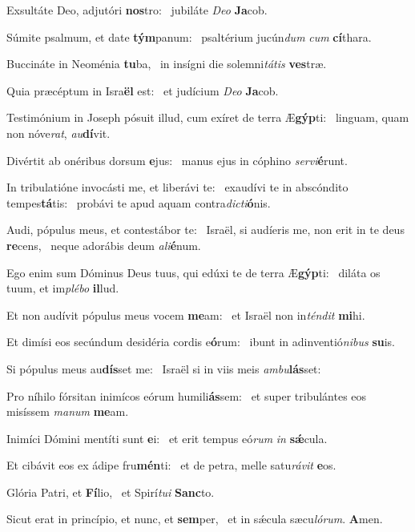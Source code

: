 \item Exsultáte Deo, adjutóri \textbf{nos}tro:~\psstar{} jubiláte \textit{Deo} \textbf{Ja}cob.
\item Súmite psalmum, et date \textbf{tým}panum:~\psstar{} psaltérium jucún\textit{dum} \textit{cum} \textbf{cí}thara.
\item Buccináte in Neoménia \textbf{tu}ba,~\psstar{} in insígni die solemni\textit{tátis} \textbf{ves}træ.
\item Quia præcéptum in Isra\textbf{ël} est:~\psstar{} et judícium \textit{Deo} \textbf{Ja}cob.
\item Testimónium in Joseph pósuit illud, cum exíret de terra Æ\textbf{gýp}ti:~\psstar{} linguam, quam non nóve\textit{rat}, \textit{au}\textbf{dí}vit.
\item Divértit ab onéribus dorsum \textbf{e}jus:~\psstar{} manus ejus in cóphino \textit{servi}\textbf{é}runt.
\item In tribulatióne invocásti me, et liberávi te:~\pscross{} exaudívi te in abscóndito tempes\textbf{tá}tis:~\psstar{} probávi te apud aquam contra\textit{dicti}\textbf{ó}nis.
\item Audi, pópulus meus, et contestábor te:~\pscross{} Israël, si audíeris me, non erit in te deus \textbf{re}cens,~\psstar{} neque adorábis deum \textit{ali}\textbf{é}num.
\item Ego enim sum Dóminus Deus tuus, qui edúxi te de terra Æ\textbf{gýp}ti:~\psstar{} diláta os tuum, et im\textit{plébo} \textbf{il}lud.
\item Et non audívit pópulus meus vocem \textbf{me}am:~\psstar{} et Israël non in\textit{téndit} \textbf{mi}hi.
\item Et dimísi eos secúndum desidéria cordis e\textbf{ó}rum:~\psstar{} ibunt in adinventió\textit{nibus} \textbf{su}is.
\item Si pópulus meus au\textbf{dís}set me:~\psstar{} Israël si in viis meis \textit{ambu}\textbf{lás}set:
\item Pro níhilo fórsitan inimícos eórum humili\textbf{ás}sem:~\psstar{} et super tribulántes eos misíssem \textit{manum} \textbf{me}am.
\item Inimíci Dómini mentíti sunt \textbf{e}i:~\psstar{} et erit tempus eó\textit{rum} \textit{in} \textbf{sǽ}cula.
\item Et cibávit eos ex ádipe fru\textbf{mén}ti:~\psstar{} et de petra, melle satu\textit{rávit} \textbf{e}os.
\item Glória Patri, et \textbf{Fí}lio,~\psstar{} et Spirí\textit{tui} \textbf{Sanc}to.
\item Sicut erat in princípio, et nunc, et \textbf{sem}per,~\psstar{} et in sǽcula sæcu\textit{lórum}. \textbf{A}men.
